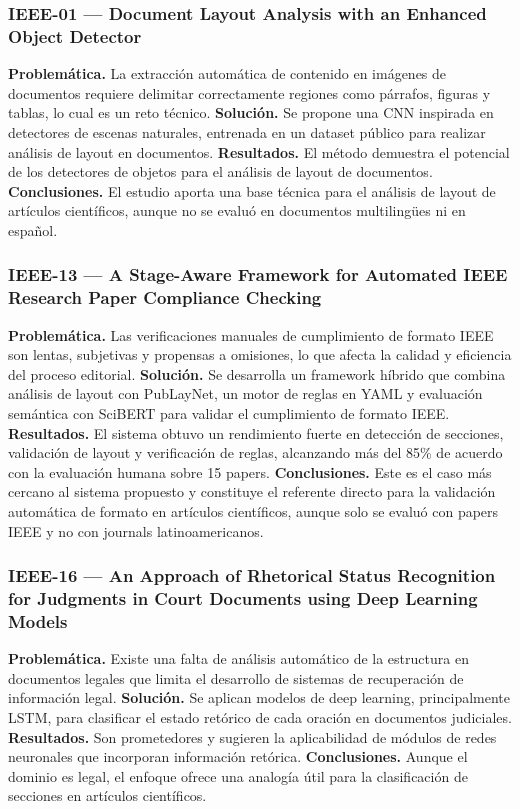 \subsubsection*{IEEE-01 --- Document Layout Analysis with an Enhanced Object Detector \cite{ref8}}

\textbf{Problemática.} La extracción automática de contenido en imágenes de documentos requiere delimitar correctamente regiones como párrafos, figuras y tablas, lo cual es un reto técnico. \textbf{Solución.} Se propone una CNN inspirada en detectores de escenas naturales, entrenada en un dataset público para realizar análisis de layout en documentos. \textbf{Resultados.} El método demuestra el potencial de los detectores de objetos para el análisis de layout de documentos. \textbf{Conclusiones.} El estudio aporta una base técnica para el análisis de layout de artículos científicos, aunque no se evaluó en documentos multilingües ni en español.

\subsubsection*{IEEE-13 --- A Stage-Aware Framework for Automated IEEE Research Paper Compliance Checking \cite{ref9}}

\textbf{Problemática.} Las verificaciones manuales de cumplimiento de formato IEEE son lentas, subjetivas y propensas a omisiones, lo que afecta la calidad y eficiencia del proceso editorial. \textbf{Solución.} Se desarrolla un framework híbrido que combina análisis de layout con PubLayNet, un motor de reglas en YAML y evaluación semántica con SciBERT para validar el cumplimiento de formato IEEE. \textbf{Resultados.} El sistema obtuvo un rendimiento fuerte en detección de secciones, validación de layout y verificación de reglas, alcanzando más del 85\% de acuerdo con la evaluación humana sobre 15 papers. \textbf{Conclusiones.} Este es el caso más cercano al sistema propuesto y constituye el referente directo para la validación automática de formato en artículos científicos, aunque solo se evaluó con papers IEEE y no con journals latinoamericanos.

\subsubsection*{IEEE-16 --- An Approach of Rhetorical Status Recognition for Judgments in Court Documents using Deep Learning Models \cite{ref10}}

\textbf{Problemática.} Existe una falta de análisis automático de la estructura en documentos legales que limita el desarrollo de sistemas de recuperación de información legal. \textbf{Solución.} Se aplican modelos de deep learning, principalmente LSTM, para clasificar el estado retórico de cada oración en documentos judiciales. \textbf{Resultados.} Son prometedores y sugieren la aplicabilidad de módulos de redes neuronales que incorporan información retórica. \textbf{Conclusiones.} Aunque el dominio es legal, el enfoque ofrece una analogía útil para la clasificación de secciones en artículos científicos.

